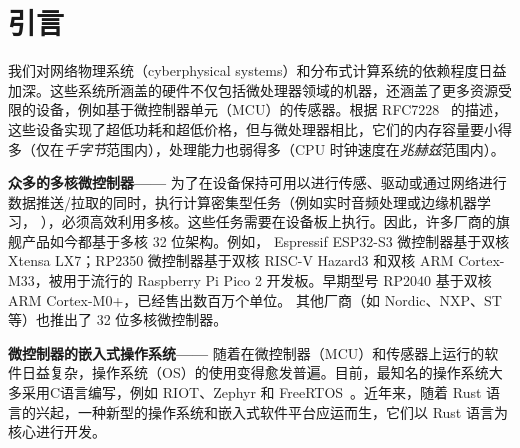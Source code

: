 
\section{引言}

我们对网络物理系统（cyberphysical systems）和分布式计算系统的依赖程度日益加深。这些系统所涵盖的硬件不仅包括微处理器领域的机器，还涵盖了更多资源受限的设备，例如基于微控制器单元（MCU）的传感器。根据 RFC7228~\cite{rfc7228} 的描述，这些设备实现了超低功耗和超低价格，但与微处理器相比，它们的内存容量要小得多（仅在\emph{千字节}范围内），处理能力也弱得多（CPU 时钟速度在\emph{兆赫兹}范围内）。

\textbf{众多的多核微控制器——} 为了在设备保持可用以进行传感、驱动或通过网络进行数据推送/拉取的同时，执行计算密集型任务（例如实时音频处理或边缘机器学习，%
），必须高效利用多核。这些任务需要在设备板上执行。因此，许多厂商的旗舰产品如今都基于多核 32 位架构。例如，%
Espressif ESP32\nobreakdash-S3 微控制器基于双核 Xtensa LX7；RP2350 微控制器基于双核 RISC-V Hazard3 和双核 ARM Cortex\nobreakdash-M33，被用于流行的 Raspberry Pi Pico 2 开发板。早期型号 RP2040 基于双核 ARM Cortex\nobreakdash-M0+，已经售出数百万个单位。
其他厂商（如 Nordic、NXP、ST 等）也推出了 32 位多核微控制器。



\textbf{微控制器的嵌入式操作系统——} 随着在微控制器（MCU）和传感器上运行的软件日益复杂，操作系统（OS）的使用变得愈发普遍。目前，最知名的操作系统大多采用C语言编写，例如 RIOT、Zephyr 和 FreeRTOS~\cite{hahm2015operating}。近年来，随着 Rust 语言的兴起，一种新型的操作系统和嵌入式软件平台应运而生，它们以 Rust 语言为核心进行开发。

